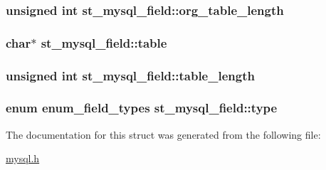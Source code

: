 \subsubsection[{org\+\_\+table\+\_\+length}]{\setlength{\rightskip}{0pt plus 5cm}unsigned int st\+\_\+mysql\+\_\+field\+::org\+\_\+table\+\_\+length}\label{structst__mysql__field_afa4e4cdb3af1c33edb72757f3fce9e7a}
\hypertarget{structst__mysql__field_a29e2e9a3a039afd113f5b01144aeadf3}{}
\subsubsection[{table}]{\setlength{\rightskip}{0pt plus 5cm}char$\ast$ st\+\_\+mysql\+\_\+field\+::table}\label{structst__mysql__field_a29e2e9a3a039afd113f5b01144aeadf3}
\hypertarget{structst__mysql__field_a3fd823f20119f559007cc41089bec0fe}{}
\subsubsection[{table\+\_\+length}]{\setlength{\rightskip}{0pt plus 5cm}unsigned int st\+\_\+mysql\+\_\+field\+::table\+\_\+length}\label{structst__mysql__field_a3fd823f20119f559007cc41089bec0fe}
\hypertarget{structst__mysql__field_a3b744bf19e92b619e725b45f83a78771}{}
\subsubsection[{type}]{\setlength{\rightskip}{0pt plus 5cm}enum {\bf enum\+\_\+field\+\_\+types} st\+\_\+mysql\+\_\+field\+::type}\label{structst__mysql__field_a3b744bf19e92b619e725b45f83a78771}


The documentation for this struct was generated from the following file\+:\begin{DoxyCompactItemize}
\item 
\hyperlink{mysql_8h}{mysql.\+h}\end{DoxyCompactItemize}
